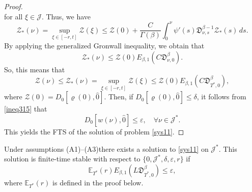 \documentclass[reqno]{amsart}
\begin{document}
\begin{proof}
\begin{equation}
\end{equation}
for all $\xi \in\mathcal{J}$. Thus, we have
\begin{equation}\label{eq321}
\mathcal{Z}_{*}(\nu )=\sup _{\xi \in[- r, t]} \mathcal{Z}(\xi) 
\leq \mathcal{Z}(0)+\frac{C}{\Gamma(\beta)} \int_0^{\nu } 
\psi'(s)\mathfrak{D}_{\nu ,s}^{\beta-1} \mathcal{Z}_{*}(s)\,ds. 
\end{equation}
By applying the generalized Gronwall inequality, we obtain that
\begin{equation}\label{ineq322}
\mathcal{Z}_{*}(\nu ) \leq \mathcal{Z}(0) E_{\beta, 1}(C\mathfrak{D}_{\nu ,0}^{\beta}).
\end{equation}
So, this means that
$$
\mathcal{Z}(\nu ) \leq \mathcal{Z}_{*}(\nu )=\sup _{\xi \in[- r, t]} 
\mathcal{Z}(\xi) \leq \mathcal{Z}(0) E_{\beta, 1}(C\mathfrak{D}_{T^{*},0}^{\beta}),
$$
where $\mathcal{Z}(0)=D_0[\varrho(0), \hat{0}]$. Then, if 
$D_0[\varrho(0), \hat{0}] \leq \delta$, it follows from \eqref{ineq315} that
$$
D_0[ w(\nu ), \hat{0}] \leq \varepsilon, \quad \forall \nu \in\mathcal{J}^{*} .
$$
This yields the FTS of the solution of problem \eqref{sys11}.
\end{proof}

\begin{theorem}\label{theo34}
Under assumptions {\rm (A1)--(A3)}there exists a solution to \eqref{sys11} on 
\( \mathcal{J}^{*} \). This solution is finite-time stable with respect to 
\( \{0, \mathcal{J}^{*}, \delta, \varepsilon, r\} \) if 
\begin{equation}\label{ineq323}
\mathbb{E}_{T^{*}}( r) E_{\beta, 1}( L\mathfrak{D}_{T^{*},0}^{\beta}) 
\leq \varepsilon, 
\end{equation}
where $\mathbb{E}_{T^{*}}( r)$ is defined in the proof below.
\end{theorem}
\end{document}
